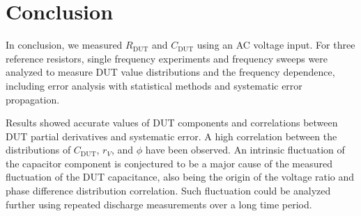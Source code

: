 \documentclass[%
 aip,
 amsmath,amssymb,
 reprint,%
]{revtex4-1}
\begin{document}

\section{Conclusion}

In conclusion, we measured $R_{\textrm{DUT}}$ and $C_{\textrm{DUT}}$ using an AC voltage input. For three reference resistors, single frequency experiments and frequency sweeps were analyzed to measure DUT value distributions and the frequency dependence, including error analysis with statistical methods and systematic error propagation. 

Results showed accurate values of DUT components and correlations between DUT partial derivatives and systematic error. A high correlation between the distributions of $C_{\textrm{DUT}}$, $r_V$, and $\phi$ have been observed. An intrinsic fluctuation of the capacitor component is conjectured to be a major cause of the measured fluctuation of the DUT capacitance, also being the origin of the voltage ratio and phase difference distribution correlation. Such fluctuation could be analyzed further using repeated discharge measurements over a long time period.
\end{document}
